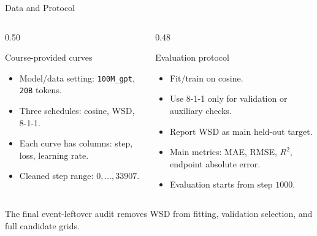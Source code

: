 \documentclass[fontset=fandol,aspectratio=169,10pt]{ctexbeamer}
\newcommand{\smallnote}[1]{{\scriptsize\color{tdltGray}#1}}
\begin{document}
\begin{frame}{Data and Protocol}
  \begin{columns}[T,onlytextwidth]
    \begin{column}{0.50\textwidth}
      \begin{block}{Course-provided curves}
        \begin{itemize}
          \item Model/data setting: \texttt{100M\_gpt}, \texttt{20B} tokens.
          \item Three schedules: cosine, WSD, 8-1-1.
          \item Each curve has columns: step, loss, learning rate.
          \item Cleaned step range: \(0,\ldots,33907\).
        \end{itemize}
      \end{block}
    \end{column}
    \begin{column}{0.48\textwidth}
      \begin{block}{Evaluation protocol}
        \begin{itemize}
          \item Fit/train on cosine.
          \item Use 8-1-1 only for validation or auxiliary checks.
          \item Report WSD as main held-out target.
          \item Main metrics: MAE, RMSE, \(R^2\), endpoint absolute error.
          \item Evaluation starts from step \(1000\).
        \end{itemize}
      \end{block}
    \end{column}
  \end{columns}
  \vspace{0.4em}
  \smallnote{The final event-leftover audit removes WSD from fitting, validation selection, and full candidate grids.}
\end{frame}
\end{document}
